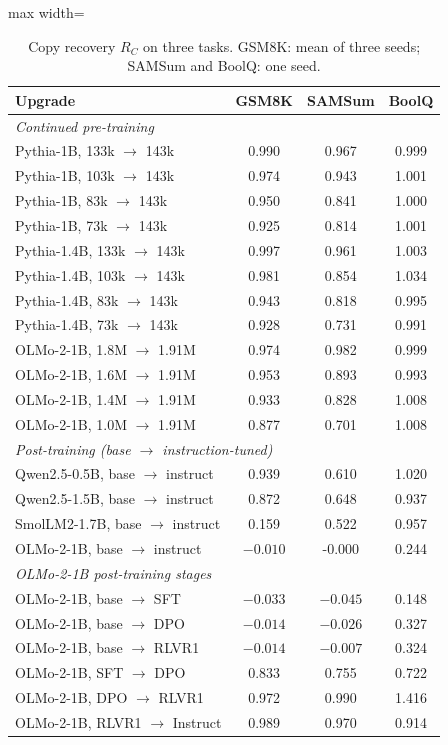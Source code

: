 \documentclass[preprint,12pt,authoryear]{elsarticle}
\begin{document}
\begin{table}[t]
\centering
\caption{Copy recovery $R_C$ on three tasks. GSM8K: mean of three seeds; SAMSum and BoolQ: one seed.}\label{tab:tasks}
\small
\begin{adjustbox}{max width=\textwidth}
\begin{tabular}{lccc}
\toprule
Upgrade & GSM8K & SAMSum & BoolQ\\
\midrule
\multicolumn{4}{l}{\emph{Continued pre-training}}\\
Pythia-1B, 133k $\to$ 143k & 0.990 & 0.967 & 0.999\\
Pythia-1B, 103k $\to$ 143k & 0.974 & 0.943 & 1.001\\
Pythia-1B, 83k $\to$ 143k & 0.950 & 0.841 & 1.000\\
Pythia-1B, 73k $\to$ 143k & 0.925 & 0.814 & 1.001\\
Pythia-1.4B, 133k $\to$ 143k & 0.997 & 0.961 & 1.003\\
Pythia-1.4B, 103k $\to$ 143k & 0.981 & 0.854 & 1.034\\
Pythia-1.4B, 83k $\to$ 143k & 0.943 & 0.818 & 0.995\\
Pythia-1.4B, 73k $\to$ 143k & 0.928 & 0.731 & 0.991\\
OLMo-2-1B, 1.8M $\to$ 1.91M & 0.974 & 0.982 & 0.999\\
OLMo-2-1B, 1.6M $\to$ 1.91M & 0.953 & 0.893 & 0.993\\
OLMo-2-1B, 1.4M $\to$ 1.91M & 0.933 & 0.828 & 1.008\\
OLMo-2-1B, 1.0M $\to$ 1.91M & 0.877 & 0.701 & 1.008\\
\multicolumn{4}{l}{\emph{Post-training (base $\to$ instruction-tuned)}}\\
Qwen2.5-0.5B, base $\to$ instruct & 0.939 & 0.610 & 1.020\\
Qwen2.5-1.5B, base $\to$ instruct & 0.872 & 0.648 & 0.937\\
SmolLM2-1.7B, base $\to$ instruct & 0.159 & 0.522 & 0.957\\
OLMo-2-1B, base $\to$ instruct & $-0.010$ & -0.000 & 0.244\\
\multicolumn{4}{l}{\emph{OLMo-2-1B post-training stages}}\\
OLMo-2-1B, base $\to$ SFT & $-0.033$ & $-0.045$ & 0.148\\
OLMo-2-1B, base $\to$ DPO & $-0.014$ & $-0.026$ & 0.327\\
OLMo-2-1B, base $\to$ RLVR1 & $-0.014$ & $-0.007$ & 0.324\\
OLMo-2-1B, SFT $\to$ DPO & 0.833 & 0.755 & 0.722\\
OLMo-2-1B, DPO $\to$ RLVR1 & 0.972 & 0.990 & 1.416\\
OLMo-2-1B, RLVR1 $\to$ Instruct & 0.989 & 0.970 & 0.914\\
\bottomrule
\end{tabular}
\end{adjustbox}
\end{table}
\end{document}

